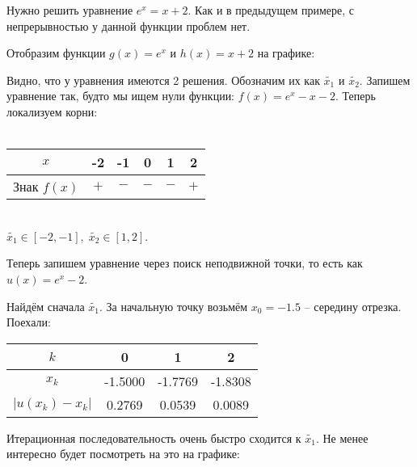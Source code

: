 \documentclass[../main.tex]{subfile}
\begin{document}
\begin{example}
	Нужно решить уравнение \(e^x=x+2.\) Как и в предыдущем примере, с
	непрерывностью у данной функции проблем нет.
	\newpage

	Отобразим функции $g(x)=e^x$ и $h(x)=x+2$ на графике:

	{\makeatletter
	\let\par\@@par
	\par{}
	\everypar{}
	\begin{wrapfigure}{l}{0.45\textwidth}
		
	\end{wrapfigure}

	Видно, что у уравнения имеются 2 решения. Обозначим их как
	$\widetilde{x_1}$ и $\widetilde{x_2}$. Запишем уравнение так, будто мы
	ищем нули функции: $f(x) = e^x-x-2$. Теперь локализуем корни:\\\\
	\begin{tabular}{ *{6}{|c}| }
		\hline
		$x$		& -2	& -1	& 0	& 1	& 2 \\
		\hline
		Знак $f(x)$ 	& $+$	& $-$	& $-$	& $-$ 	& $+$\\
		\hline
	\end{tabular}
	\\

	$\widetilde{x_1}\in[-2,-1],\;\widetilde{x_2}\in[1,2]$.

	Теперь запишем уравнение через поиск неподвижной точки, то есть как
	$u(x)=e^x-2$.
	\par}


	Найдём сначала $\widetilde{x_1}$. За начальную точку возьмём $x_0=-1.5$ --
	середину отрезка. Поехали:

	\begin{tabular}{*{4}{|c}|}
		\hline
		$k$		& 0	& 1	& 2	\\
		\hline
		$x_k$		&-1.5000&-1.7769&-1.8308\\
		\hline
		$|u(x_k)-x_k|$	&0.2769	&0.0539	&0.0089	\\
		\hline
	\end{tabular}
	\newline

	Итерационная последовательность очень быстро сходится к $\widetilde{x_1}$.
	Не менее интересно будет посмотреть на это на графике:
	\newline

	

	\newpage


\end{example}
\end{document}
